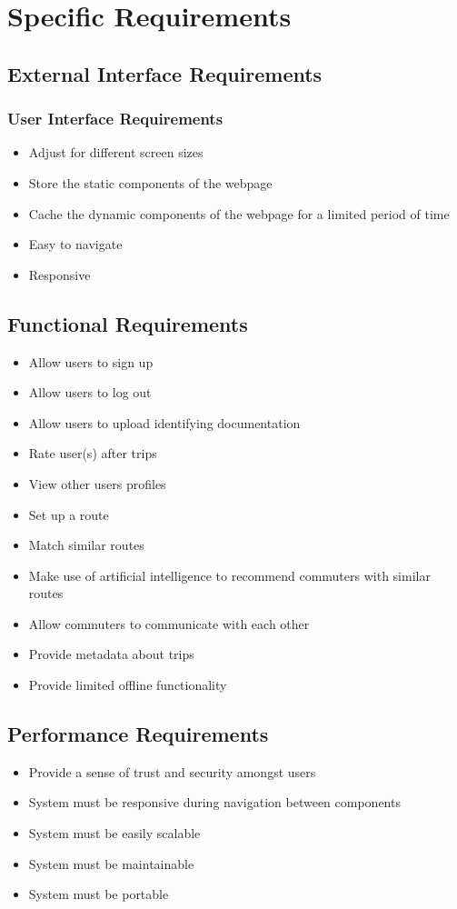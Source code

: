\documentclass[a4paper]{article}
\begin{document}
\section{Specific Requirements}
\subsection{External Interface Requirements}
	\subsubsection{User Interface Requirements}
    	\begin{itemize}
            \item Adjust for different screen sizes
            \item Store the static components of the webpage
            \item Cache the dynamic components of the webpage for a limited period of time
            \item Easy to navigate
            \item Responsive
    	\end{itemize}
        
\subsection{Functional Requirements}
	\begin{itemize}
    	\item Allow users to sign up 
        \item Allow users to log out
        \item Allow users to upload identifying documentation
        \item Rate user(s) after trips
        \item View other users profiles
        \item Set up a route
        \item Match similar routes
        \item Make use of artificial intelligence to recommend commuters with similar routes
        \item Allow commuters to communicate with each other
        \item Provide metadata about trips
        \item Provide limited offline functionality
    \end{itemize}

\subsection{Performance Requirements}
	\begin{itemize}
    	\item Provide a sense of trust and security amongst users
        \item System must be responsive during navigation between components
        \item System must be easily scalable
        \item System must be maintainable
        \item System must be portable
    \end{itemize}
    
\end{document}
